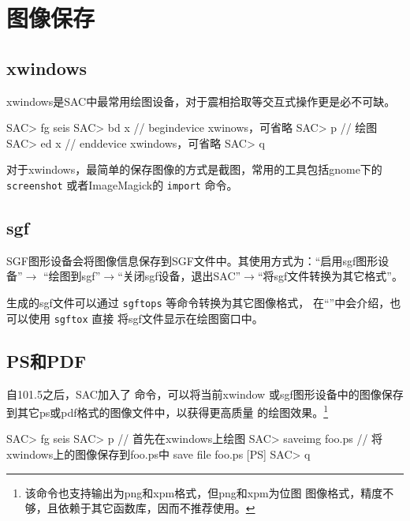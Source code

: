 \section{图像保存}
\label{sec:save-image}

\subsection{xwindows}
xwindows是SAC中最常用绘图设备，对于震相拾取等交互式操作更是必不可缺。
\begin{SACCode}
SAC> fg seis
SAC> bd x       // begindevice xwinows，可省略
SAC> p          // 绘图
SAC> ed x       // enddevice xwindows，可省略
SAC> q
\end{SACCode}

对于xwindows，最简单的保存图像的方式是截图，常用的工具包括gnome下的
\texttt{screenshot} 或者ImageMagick的 \texttt{import} 命令。

\subsection{sgf}
SGF图形设备会将图像信息保存到SGF文件中。其使用方式为：``启用sgf图形设备''$\rightarrow$
``绘图到sgf''$\rightarrow$``关闭sgf设备，退出SAC''$\rightarrow$``将sgf文件转换为其它格式''。

生成的sgf文件可以通过 \texttt{sgftops} 等命令转换为其它图像格式，
在``''中会介绍，也可以使用 \texttt{sgftox} 直接
将sgf文件显示在绘图窗口中。

\subsection{PS和PDF}
自101.5之后，SAC加入了  命令，可以将当前xwindow
或sgf图形设备中的图像保存到其它ps或pdf格式的图像文件中，以获得更高质量
的绘图效果。\footnote{该命令也支持输出为png和xpm格式，但png和xpm为位图
图像格式，精度不够，且依赖于其它函数库，因而不推荐使用。}

\begin{SACCode}
SAC> fg seis
SAC> p                      // 首先在xwindows上绘图
SAC> saveimg foo.ps         // 将xwindows上的图像保存到foo.ps中
save file foo.ps [PS]
SAC> q
\end{SACCode}

